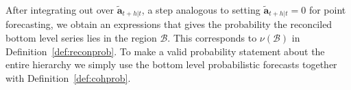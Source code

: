 \documentclass[a4paper, 11pt]{article}
\theoremstyle{theo}
\theoremstyle{definition}
\begin{document}
After integrating out over $\tilde{\bm{a}}_{t+h|t}$, a step analogous to setting $\tilde{\bm{a}}_{t+h|t}=0$ for point forecasting, we obtain an expressions that gives the probability the reconciled bottom level series lies in the region $\mathcal{B}$. This corresponds to $\nu(\mathcal{B})$ in Definition~\ref{def:reconprob}.  To make a valid probability statement about the entire hierarchy we simply use the bottom level probabilistic forecasts together with Definition~\ref{def:cohprob}. 


%
\end{document}
